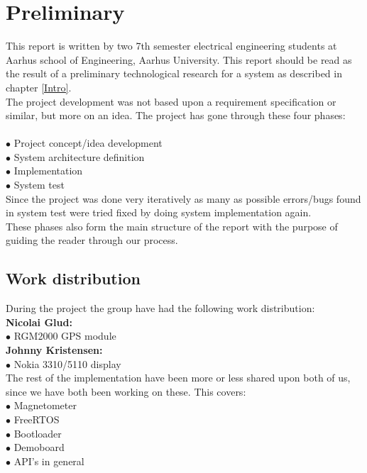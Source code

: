 \chapter{Preliminary}

This report is written by two 7th semester electrical engineering students at Aarhus school of Engineering, Aarhus University. This report should be read as the result of a preliminary technological research for a system as described in chapter \ref{Intro}.\\
The project development was not based upon a requirement specification or similar, but more on an idea. The project has gone through these four phases:\\
\\
$\bullet$ Project concept/idea development\\
$\bullet$ System architecture definition\\
$\bullet$ Implementation\\
$\bullet$ System test\\

Since the project was done very iteratively as many as possible errors/bugs found in system test were tried fixed by doing system implementation again.\\
These phases also form the main structure of the report with the purpose of guiding the reader through our process.\\

\section{Work distribution}
During the project the group have had the following work distribution:\\
\textbf{Nicolai Glud:}\\
$\bullet$\hspace*{.2cm} RGM2000 GPS module\\
\textbf{Johnny Kristensen:}\\
$\bullet$\hspace*{.2cm} Nokia 3310/5110 display\\
The rest of the implementation have been more or less shared upon both of us, since we have both been working on these. This covers:\\
$\bullet$\hspace*{.2cm} Magnetometer\\
$\bullet$\hspace*{.2cm} FreeRTOS\\
$\bullet$\hspace*{.2cm} Bootloader\\
$\bullet$\hspace*{.2cm} Demoboard\\
$\bullet$\hspace*{.2cm} API's in general